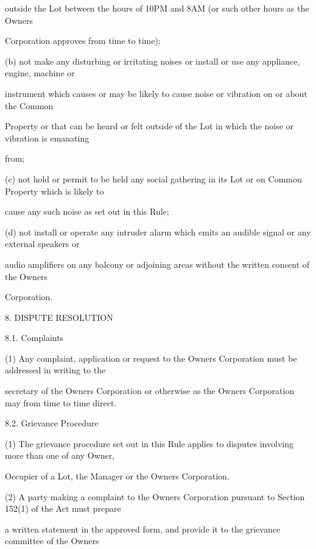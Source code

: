 \documentclass{article}
\begin{document}
{\fontsize{10.02}{1}outside the Lot between the hours of 10PM and 8AM (or such other hours as the Owners }

{\fontsize{10.02}{1}Corporation approves from time to time); }

{\fontsize{9.962}{1}(b) not make any disturbing or irritating noises or install or use any appliance, engine, machine or }

{\fontsize{10.02}{1}instrument which causes or may be likely to cause noise or vibration on or about the Common }

{\fontsize{10.02}{1}Property or that can be heard or felt outside of the Lot in which the noise or vibration is emanating }

{\fontsize{10.02}{1}from; }

{\fontsize{9.962}{1}(c) not hold or permit to be held any social gathering in its Lot or on Common Property which is likely to }

{\fontsize{10.02}{1}cause any such noise as set out in this Rule; }

{\fontsize{9.962}{1}(d) not install or operate any intruder alarm which emits an audible signal or any external speakers or }

{\fontsize{10.02}{1}audio amplifiers on any balcony or adjoining areas without the written consent of the Owners }

{\fontsize{10.02}{1}Corporation. }

{\fontsize{9.99}{1}8. DISPUTE RESOLUTION }

{\fontsize{9.99}{1}8.1. Complaints }

{\fontsize{9.962}{1}(1) Any complaint, application or request to the Owners Corporation must be addressed in writing to the }

{\fontsize{10.02}{1}secretary of the Owners Corporation or otherwise as the Owners Corporation may from time to time direct. }

{\fontsize{9.99}{1}8.2. Grievance Procedure }

{\fontsize{9.962}{1}(1) The grievance procedure set out in this Rule applies to disputes involving more than one of any Owner, }

{\fontsize{10.02}{1}Occupier of a Lot, the Manager or the Owners Corporation. }

{\fontsize{9.962}{1}(2) A party making a complaint to the Owners Corporation pursuant to Section 152(1) of the Act must prepare }

{\fontsize{10.02}{1}a written statement in the approved form, and provide it to the grievance committee of the Owners }
\end{document}
